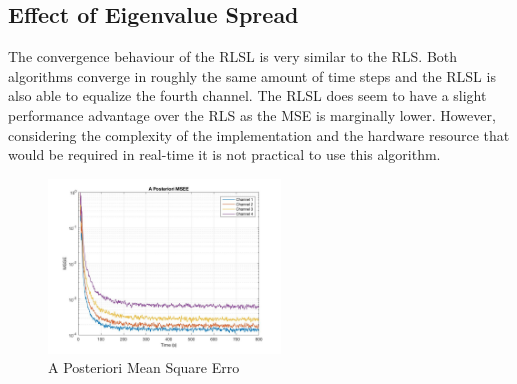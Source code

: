 \documentclass[journal]{IEEEtran}
\begin{document}
\subsection{Effect of Eigenvalue Spread}
The convergence behaviour of the RLSL is very similar to the RLS. Both algorithms converge in roughly the
same amount of time steps and the RLSL is also able to equalize the fourth channel. The RLSL does seem to have a
slight performance advantage over the RLS as the MSE is marginally lower. However, considering the complexity of the implementation
and the hardware resource that would be required in real-time it is not practical to use this algorithm.
\begin{figure}[H]
  \centering
  \captionsetup{justification=centering,font = small}
  \includegraphics[width=0.55\textwidth, inner] {Plots/Project3_MSEE.jpg}
  \caption{A Posteriori Mean Square Erro}
    \label{fig:MSEEp}
\end{figure}
\end{document}

